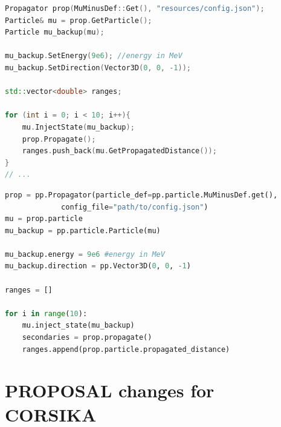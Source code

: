 \documentclass[aspectratio=1610, captions=tableheading, 11pt]{beamer}
\begin{document}
\begin{frame}[fragile]
\begin{lstlisting}[language=C++,basicstyle=\ttfamily,keywordstyle=\color{red}, escapechar=\!]
Propagator prop(MuMinusDef::Get(), "resources/config.json");
Particle& mu = prop.GetParticle();
Particle mu_backup(mu);

mu_backup.SetEnergy(9e6); //energy in MeV
mu_backup.SetDirection(Vector3D(0, 0, -1));

std::vector<double> ranges;

for (int i = 0; i < 10; i++){
    mu.InjectState(mu_backup);
    prop.Propagate();  
    ranges.push_back(mu.GetPropagatedDistance());
}
// ...
\end{lstlisting}
\end{frame}

\begin{frame}[fragile]
\begin{lstlisting}[language=python,basicstyle=\ttfamily,keywordstyle=\color{red}, escapechar=\!]
prop = pp.Propagator(particle_def=pp.particle.MuMinusDef.get(), 
		     config_file="path/to/config.json")
mu = prop.particle
mu_backup = pp.particle.Particle(mu)

mu_backup.energy = 9e6 #energy in MeV
mu_backup.direction = pp.Vector3D(0, 0, -1)

ranges = []

for i in range(10):
    mu.inject_state(mu_backup)
    secondaries = prop.propagate()
    ranges.append(prop.particle.propagated_distance)
\end{lstlisting}

\end{frame}


\section{PROPOSAL changes for CORSIKA}
\end{document}
